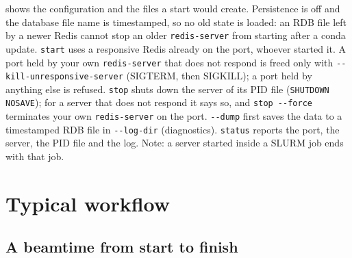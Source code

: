 \documentclass[11pt,a4paper]{article}
\newcommand{\cmd}[1]{\texttt{#1}}
\begin{document}
\begin{description}[style=nextline,leftmargin=1.5em]
    shows the configuration and the files a start would create. Persistence is off and the database
    file name is timestamped, so no old state is loaded: an RDB file left by a newer Redis cannot stop
    an older \cmd{redis-server} from starting after a conda update.
    \cmd{start} uses a responsive Redis already on the port, whoever started it. A port held by your
    own \cmd{redis-server} that does not respond is freed only with
    \cmd{-{}-kill-unresponsive-server} (SIGTERM, then SIGKILL); a port held by anything else is
    refused. \cmd{stop} shuts down the server of its PID file (\cmd{SHUTDOWN NOSAVE}); for a server
    that does not respond it says so, and \cmd{stop -{}-force} terminates your own
    \cmd{redis-server} on the port. \cmd{-{}-dump} first saves the data to a timestamped RDB file in
    \cmd{-{}-log-dir} (diagnostics). \cmd{status} reports the port, the server, the PID file and the
    log. Note: a server started inside a SLURM job ends with that job.
\end{description}

\section{Typical workflow}

\subsection{A beamtime from start to finish}
\end{document}
